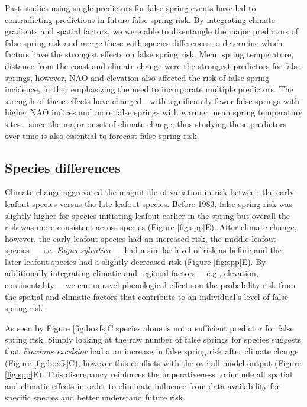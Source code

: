 \documentclass{article}\usepackage[]{graphicx}\usepackage[]{color}
\begin{document}
Past studies using single predictors for false spring events \citep{Liu2018, Ma2018, Vitasse2018, Vitra2017, Wypych2016a} have led to contradicting predictions in future false spring risk. By integrating climate gradients and spatial factors, we were able to disentangle the major predictors of false spring risk and merge these with species differences to determine which factors have the strongest effects on false spring risk. Mean spring temperature, distance from the coast and climate change were the strongest predictors for false springs, however, NAO and elevation also affected the risk of false spring incidence, further emphasizing the need to incorporate multiple predictors. The strength of these effects have changed---with significantly fewer false springs with higher NAO indices and more false springs with warmer mean spring temperature sites---since the major onset of climate change, thus studying these predictors over time is also essential to forecast false spring risk.

\subsection*{Species differences}
Climate change aggrevated the magnitude of variation in risk between the early-leafout species versus the late-leafout species. Before 1983, false spring risk was slightly higher for species initiating leafout earlier in the spring but overall the risk was more consistent across species (Figure \ref{fig:spp}E). After climate change, however, the early-leafout species had an increased risk, the middle-leafout species --- i.e. \textit{Fagus sylvatica} --- had a similar level of risk as before and the later-leafout species had a slightly decreased risk (Figure \ref{fig:spp}E). By additionally integrating climatic and regional factors ---e.g., elevation, continentality--- we can unravel phenological effects on the probability risk from the spatial and climatic factors that contribute to an individual's level of false spring risk.

As seen by Figure \ref{fig:boxfs}C species alone is not a sufficient predictor for false spring risk. Simply looking at the raw number of false springs for species suggests that \textit{Fraxinus excelsior} had a an increase in false spring risk after climate change (Figure \ref{fig:boxfs}C), however this conflicts with the overall model output (Figure \ref{fig:spp}E). This discrepancy reinforces the imperativeness to include all spatial and climatic effects in order to eliminate influence from data availability for specific species and better understand future risk. 
\end{document}
